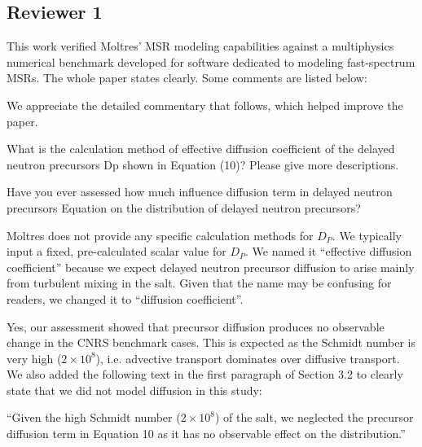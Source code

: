 \documentclass[answers,12pt]{exam}
\begin{document}
\begin{questions}
\section*{Reviewer 1}

        \question This work verified Moltres' MSR modeling capabilities against
        a multiphysics numerical benchmark developed for software dedicated to
        modeling fast-spectrum MSRs. The whole paper states clearly. Some
        comments are listed below:
        
        \begin{solution}
            We appreciate the detailed commentary that follows, which helped
            improve the paper.
        \end{solution}

        \question What is the calculation method of effective diffusion
        coefficient of the delayed neutron precursors Dp shown in Equation
        (10)? Please give more descriptions.
        
        Have you ever assessed how much
        influence diffusion term in
        delayed neutron precursors Equation on the distribution of delayed
        neutron precursors?

        \begin{solution}
        	Moltres does not provide any specific calculation methods for
        	$D_P$. We typically input a fixed, pre-calculated scalar value
        	for $D_P$. We named it ``effective diffusion coefficient'' because
        	we expect delayed neutron precursor diffusion to arise mainly from
        	turbulent mixing in the salt. Given that the name may be confusing
        	for readers, we changed it to ``diffusion coefficient''.
        	
        	Yes, our assessment showed that precursor diffusion produces no
        	observable change in the CNRS benchmark cases. This is expected as
        	the Schmidt number is very high ($2\times10^8$), i.e. advective
        	transport dominates over diffusive transport. We also added the
        	following text in the first paragraph of Section 3.2 to clearly
        	state that we did not model diffusion in this study:
        	
        	``Given the high Schmidt number ($2\times10^8$)
\cite{tiberga_results_2020} of the salt, we neglected the precursor diffusion
term in Equation 10 as it has no observable effect on the distribution.''
        \end{solution}


\end{questions}
\end{document}
